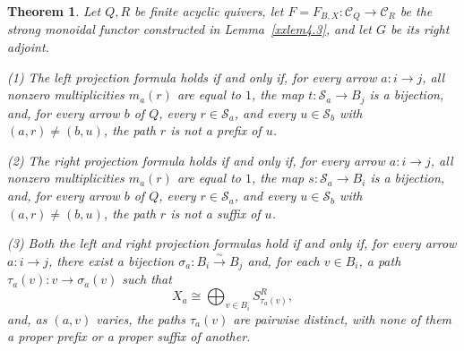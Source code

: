 \documentclass{amsart}
\newtheorem{theorem}{Theorem}[section]
\theoremstyle{definition}
\theoremstyle{remark}
\numberwithin{equation}{section}
\begin{document}
\begin{theorem}\label{xxthm5.2}
Let $Q,R$ be finite acyclic quivers, let
$F=F_{B,X}\colon\mathcal C_Q\to\mathcal C_R$
be the strong monoidal functor constructed in
Lemma~\ref{xxlem4.3},
and let $G$ be its right adjoint.

\textup{(1)}
The left projection formula holds if and only if, for every arrow
$a\colon i\to j$,
all nonzero multiplicities
$m_a(r)$
are equal to $1$,
the map $t\colon\mathcal S_a\to B_j$ is a bijection, and, for every arrow $b$ of $Q$, every
$r\in\mathcal S_a$, and every
$u\in\mathcal S_b$ with $(a,r)\neq(b,u)$,
the path $r$ is not a prefix of $u$.

\textup{(2)}
The right projection formula holds if and only if, for every arrow
$a\colon i\to j$,
all nonzero multiplicities
$m_a(r)$
are equal to $1$,
the map $s\colon\mathcal S_a\to B_i$ is a bijection, and, for every arrow $b$ of $Q$, every
$r\in\mathcal S_a$, and every
$u\in\mathcal S_b$ with $(a,r)\neq(b,u)$,
the path $r$ is not a suffix of $u$.

\textup{(3)}
Both the left and right projection formulas hold if and only if, for every
arrow $a\colon i\to j$, there exist a bijection
$\sigma_a\colon B_i\xrightarrow{\sim}B_j$ and, for each $v\in B_i$, a path
$\tau_a(v)\colon v\to\sigma_a(v)$ such that
\begin{equation}\label{xxeq5-4}
X_a
\cong
\bigoplus_{v\in B_i}S_{\tau_a(v)}^R,
\end{equation}
and, as $(a,v)$ varies, the paths $\tau_a(v)$ are pairwise distinct, with
none of them a proper prefix or a proper suffix of another.
\end{theorem}
\end{document}
